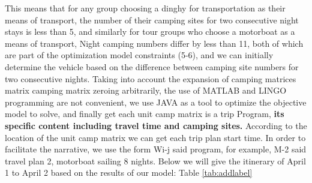 	\par This means that for any group choosing a dinghy for transportation as their means of transport, the number of their camping sites for two consecutive night stays is less than 5, and similarly for tour groups who choose a motorboat as a means of transport, Night camping numbers differ by less than 11, both of which are part of the optimization model constraints (5-6), and we can initially determine the vehicle based on the difference between camping site numbers for two consecutive nights. Taking into account the expansion of camping matrices matrix camping matrix zeroing arbitrarily, the use of MATLAB and LINGO programming are not convenient, we use JAVA as a tool to optimize the objective model to solve, and finally get each unit camp matrix is a trip Program, \textbf{its specific content including travel time and camping sites.} According to the location of the unit camp matrix we can get each trip plan start time. In order to facilitate the narrative, we use the form Wi-j said program, for example, M-2 said travel plan 2, motorboat sailing 8 nights. Below we will give the itinerary of April 1 to April 2 based on the results of our model: Table \ref{tab:addlabel}
	
